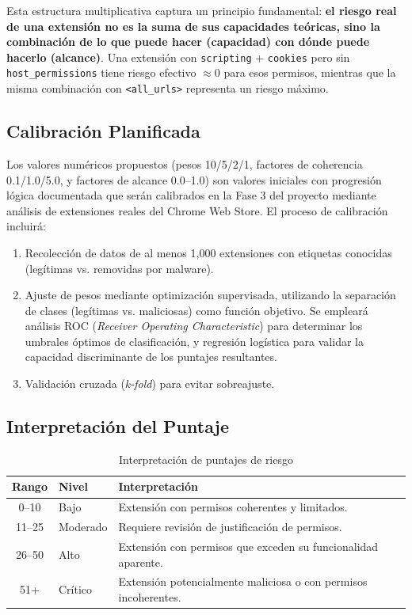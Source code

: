 \documentclass[12pt,oneside]{report}
\begin{document}
Esta estructura multiplicativa captura un principio fundamental: \textbf{el riesgo real de una extensión no es la suma de sus capacidades teóricas, sino la combinación de lo que puede hacer (capacidad) con dónde puede hacerlo (alcance)}. Una extensión con \texttt{scripting} + \texttt{cookies} pero sin \texttt{host\_permissions} tiene riesgo efectivo $\approx 0$ para esos permisos, mientras que la misma combinación con \texttt{<all\_urls>} representa un riesgo máximo.

\subsection{Calibración Planificada}

Los valores numéricos propuestos (pesos 10/5/2/1, factores de coherencia 0.1/1.0/5.0, y factores de alcance 0.0--1.0) son valores iniciales con progresión lógica documentada que serán calibrados en la Fase 3 del proyecto mediante análisis de extensiones reales del Chrome Web Store. El proceso de calibración incluirá:

\begin{enumerate}
    \item Recolección de datos de al menos 1,000 extensiones con etiquetas conocidas (legítimas vs. removidas por malware).
    \item Ajuste de pesos mediante optimización supervisada, utilizando la separación de clases (legítimas vs. maliciosas) como función objetivo. Se empleará análisis ROC (\textit{Receiver Operating Characteristic}) para determinar los umbrales óptimos de clasificación, y regresión logística para validar la capacidad discriminante de los puntajes resultantes.
    \item Validación cruzada (\textit{k-fold}) para evitar sobreajuste.
\end{enumerate}

\subsection{Interpretación del Puntaje}

\begin{table}[!htbp]
\centering
\begin{tabular}{|c|l|p{8cm}|}
\hline
\textbf{Rango} & \textbf{Nivel} & \textbf{Interpretación} \\
\hline
0--10 & Bajo & Extensión con permisos coherentes y limitados. \\
\hline
11--25 & Moderado & Requiere revisión de justificación de permisos. \\
\hline
26--50 & Alto & Extensión con permisos que exceden su funcionalidad aparente. \\
\hline
51+ & Crítico & Extensión potencialmente maliciosa o con permisos incoherentes. \\
\hline
\end{tabular}
\caption{Interpretación de puntajes de riesgo}
\end{table}
\end{document}
